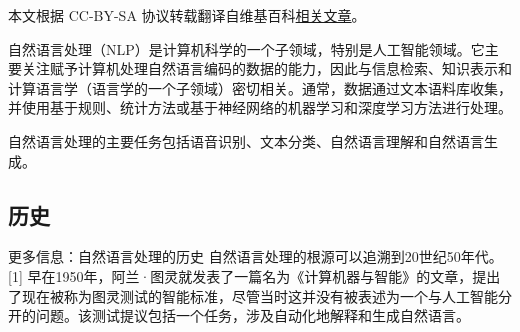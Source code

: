 
本文根据 CC-BY-SA 协议转载翻译自维基百科\href{https://en.wikipedia.org/wiki/Natural_language_processing}{相关文章}。

自然语言处理（NLP）是计算机科学的一个子领域，特别是人工智能领域。它主要关注赋予计算机处理自然语言编码的数据的能力，因此与信息检索、知识表示和计算语言学（语言学的一个子领域）密切相关。通常，数据通过文本语料库收集，并使用基于规则、统计方法或基于神经网络的机器学习和深度学习方法进行处理。

自然语言处理的主要任务包括语音识别、文本分类、自然语言理解和自然语言生成。
\subsection{历史} 
更多信息：自然语言处理的历史  
自然语言处理的根源可以追溯到20世纪50年代。[1] 早在1950年，阿兰·图灵就发表了一篇名为《计算机器与智能》的文章，提出了现在被称为图灵测试的智能标准，尽管当时这并没有被表述为一个与人工智能分开的问题。该测试提议包括一个任务，涉及自动化地解释和生成自然语言。
